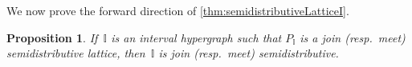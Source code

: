 \documentclass{amsart}
\newtheorem{proposition}[theorem]{Proposition}
\theoremstyle{definition}
\newcommand{\cal}[1]{\mathcal{#1}} %
\newcommand{\ssm}{\smallsetminus} %
\newcommand{\eqdef}{\mbox{\,\raisebox{0.2ex}{\scriptsize\ensuremath{\mathrm:}}\ensuremath{=}\,}} %
\newcommand{\vincent}[1]{\todo[size=\tiny,color=blue!30]{ #1 \\ \hfill --- V.}\,}
\newcommand{\II}{\mathbb I} %
\newcommand{\cIJ}{\cal{IJ}} %
\begin{document}
We now prove the forward direction of \cref{thm:semidistributiveLatticeI}.

\begin{proposition}
\label{prop:semidistributiveForward}
If~$\II$ is an interval hypergraph such that $P_\II$ is a join (resp.~meet) semidistributive lattice, then~$\II$ is join (resp.~meet) semidistributive.
\end{proposition}

%
%
%
\end{document}
